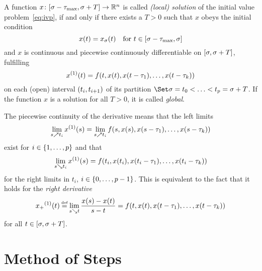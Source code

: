     \begin{definition}\label{def:solution-dde}
        A function $x\colon[\sigma-\tau_{\max},\sigma+T]\to\mathbb{R}^n$ is called \emph{(local) solution} of the initial value problem~\eqref{eq:ivp}, if and only if there exists a $T>0$ such that
        $x$ obeys the initial condition
        \begin{equation*}
            x(t) = x_{\sigma}(t) \quad\text{for } t\in[\sigma-\tau_{\max},\sigma]
        \end{equation*}
        and $x$ is continuous and piecewise continuously differentiable on $[\sigma,\sigma+T]$, fulfilling
        \begin{equation*}
            \D{x}(t) = f(t,x(t),x(t-\tau_1),\ldots,x(t-\tau_k))
        \end{equation*}
        on each (open) interval $(t_i,t_{i+1})$ of its partition $\partition{\tzero=t_0}{t_p=\tzero+T}$.
        If the function $x$ is a solution for all $T>0$, it is called \emph{global}.
    \end{definition}

    The piecewise continuity of the derivative means that the left limits
    \begin{equation*}
        \lim_{s\upto t_i}\D{x}(s) = \lim_{s\upto t_i}f(s,x(s),x(s-\tau_1),\ldots,x(s-\tau_k))
    \end{equation*}
    exist for $i\in\left\{1,\ldots,p\right\}$ and that
    \begin{equation*}
        \lim_{s\downto t_i}\D{x}(s) = f(t_i,x(t_i),x(t_i-\tau_1),\ldots,x(t_i-\tau_k))
    \end{equation*}
    for the right limits in $t_i$, $i\in\left\{0,\ldots,p-1\right\}$.
    This is equivalent to the fact that it holds for the \emph{right derivative}
    \begin{equation*}
        \D{x_+}(t)\defeq
        \lim_{s\downto t}\frac{x(s)-x(t)}{s-t}
        = f(t,x(t),x(t-\tau_1),\ldots,x(t-\tau_k))
    \end{equation*}
    for all $t\in[\sigma,\sigma+T]$.


\section{Method of Steps}
    \label{sec:method-of-steps}


